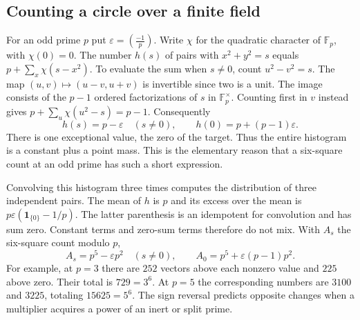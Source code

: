 \documentclass[12pt,letterpaper]{article}
\begin{document}
\subsection{Counting a circle over a finite field}
For an odd prime $p$ put $\varepsilon=\left(\frac{-1}{p}\right)$. Write $\chi$ for the quadratic character of $\mathbb F_p$, with $\chi(0)=0$. The number $h(s)$ of pairs with $x^2+y^2=s$ equals $p+\sum_x\chi(s-x^2)$. To evaluate the sum when $s\ne0$, count $u^2-v^2=s$. The map $(u,v)\mapsto(u-v,u+v)$ is invertible since two is a unit. The image consists of the $p-1$ ordered factorizations of $s$ in $\mathbb F_p^\times$. Counting first in $v$ instead gives $p+\sum_u\chi(u^2-s)=p-1$. Consequently
\[
 h(s)=p-\varepsilon\quad(s\ne0),\qquad
 h(0)=p+(p-1)\varepsilon .
\]
There is one exceptional value, the zero of the target. Thus the entire histogram is a constant plus a point mass. This is the elementary reason that a six-square count at an odd prime has such a short expression.
\par
Convolving this histogram three times computes the distribution of three independent pairs. The mean of $h$ is $p$ and its excess over the mean is $p\varepsilon(\mathbf1_{\{0\}}-1/p)$. The latter parenthesis is an idempotent for convolution and has sum zero. Constant terms and zero-sum terms therefore do not mix. With $A_s$ the six-square count modulo $p$,
\[
 A_s=p^5-\varepsilon p^2 \quad(s\ne0),\qquad
 A_0=p^5+\varepsilon(p-1)p^2 .
\]
For example, at $p=3$ there are $252$ vectors above each nonzero value and $225$ above zero. Their total is $729=3^6$. At $p=5$ the corresponding numbers are $3100$ and $3225$, totaling $15625=5^6$. The sign reversal predicts opposite changes when a multiplier acquires a power of an inert or split prime.
\end{document}

